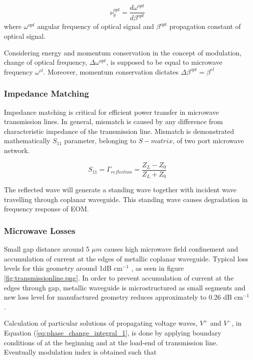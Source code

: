 \documentclass[thesis]{deutez}
\begin{document}
    \begin{equation}
        \nu_{g}^{opt} = \frac{d\omega^{opt}}{d\beta^{opt}}
    \end{equation}
    where $\omega^{opt}$ angular frequency of optical signal and $\beta^{opt}$ propagation constant of optical signal.

    Considering energy and momentum conservation in the concept of modulation, change of optical frequency, $\Delta\omega^{opt}$, is supposed to be equal to microwave frequency $\omega^{el}$. Moreover, momentum conservation dictates $\Delta\beta^{opt} =  \beta^{el}$
    
    \subsubsection{Impedance Matching}

    Impedance matching is critical for efficient power transfer in microwave transmission lines. In general, mismatch is caused by any difference from characteristic impedance of the transmission line. Mismatch is demonstrated mathematically $S_{11}$ parameter, belonging to $S-matrix$, of two port microwave network.

    \begin{equation}
        S_{11} = \Gamma_{reflection} = \frac{Z_L-Z_0}{Z_L+Z_0} 
        \label{eq:reflection_coeff}
    \end{equation}

    The reflected wave will generate a standing wave together with incident wave travelling through coplanar waveguide. This standing wave causes degradation in frequency response of EOM. 

    
    \subsubsection{Microwave Losses}

    Small gap distance around 5 $\mu m$ causes high microwave field confinement and accumulation of current at the edges of metallic coplanar waveguide. Typical loss levels for this geometry around 1dB cm$^{-1}$ \cite{1}, as seen in figure \ref{fig:transmissionline.png}. In order to prevent accumulation of current at the edges through gap, metallic waveguide is microstructured as small segments and new loss level for manufactured geometry reduces approximately to 0.26 dB cm$^{-1}$ \cite{19}.

    \vline
    
    Calculation of particular solutions of propagating voltage waves, $V^+$ and $V^-$, in Equation (\ref{eq:phase_change_integral_1}, is done by applying boundary conditions of at the beginning and at the load-end of transmission line. Eventually modulation index is obtained such that
    
\end{document}
